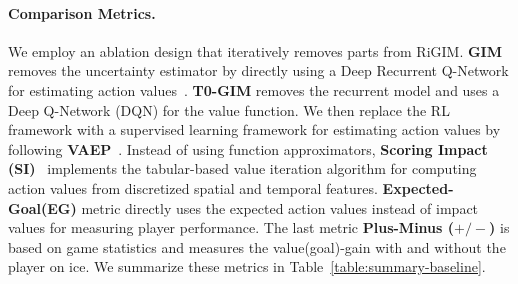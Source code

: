 \documentclass{article}
\newcommand{\sys}{RiGIM}
\newcommand{\system}{\sys\;}
\begin{document}
\paragraph{Comparison Metrics.} We employ an ablation design that iteratively removes parts from \system.  {\bf GIM} removes the uncertainty estimator by directly using a Deep Recurrent Q-Network for estimating action values~\cite{Liu2018DRL}. {\bf T0-GIM} removes the recurrent model and uses a Deep Q-Network (DQN) for the value function. We then replace the RL framework with a supervised learning framework for estimating action values by following {\bf VAEP}~\cite{Decroos2019Actions}. Instead of using function approximators, {\bf Scoring Impact (SI)}~\cite{Routley2015Markov} implements the tabular-based value iteration algorithm for computing action values from discretized spatial and temporal features. {\bf Expected-Goal(EG)} metric directly uses the expected action values instead of impact values for measuring player performance. The last 
metric {\bf  Plus-Minus ($+/-$)}
is based on game statistics and measures the value(goal)-gain with and without the player on ice. We summarize these metrics in Table~\ref{table:summary-baseline}.
\end{document}
